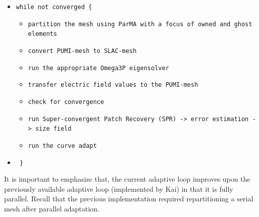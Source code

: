 \documentclass[review,12pt]{elsarticle_summary_report}
\begin{document}
\begin{itemize}
  \item[] \texttt{while not converged \{ }
   \begin{itemize}
     \item \texttt{partition the mesh using ParMA with a focus of owned and ghost elements}
     \item \texttt{convert PUMI-mesh to SLAC-mesh}
     \item \texttt{run the appropriate Omega3P eigensolver}
     \item \texttt{transfer electric field values to the PUMI-mesh}
     \item \texttt{check for convergence}
     \item \texttt{run Super-convergent Patch Recovery (SPR) -> error estimation -> size field}
     \item \texttt{run the curve adapt}
   \end{itemize}

 \item[] \texttt{  \} }
\end{itemize}
It is important to emphasize that, the current adaptive loop improves upon the previously available adaptive loop (implemented by Kai) in that it is fully parallel. Recall that the previous implementation required repartitioning a serial mesh after parallel adaptation.
\end{document}
